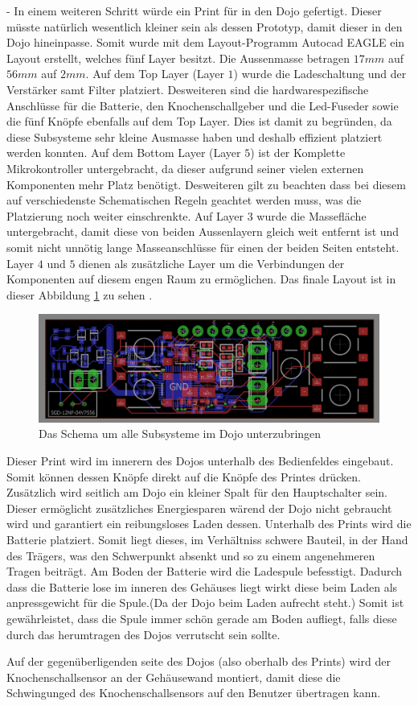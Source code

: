 - In einem weiteren Schritt würde ein Print für in den Dojo gefertigt. Dieser müsste natürlich wesentlich kleiner sein als dessen Prototyp, damit dieser in den Dojo hineinpasse. Somit wurde mit dem Layout-Programm Autocad EAGLE ein Layout erstellt, welches fünf Layer besitzt. Die Aussenmasse betragen $17mm$ auf $56mm$ auf $2mm$. Auf dem Top Layer (Layer $1$) wurde die Ladeschaltung und der Verstärker samt Filter platziert. Desweiteren sind die  hardwarespezifische Anschlüsse für die Batterie, den Knochenschallgeber und die Led-Fuseder sowie die fünf Knöpfe ebenfalls auf dem Top Layer. Dies ist damit zu begründen, da diese Subsysteme sehr kleine Ausmasse haben und deshalb effizient platziert werden konnten. Auf dem Bottom Layer (Layer $5$) ist der Komplette Mikrokontroller untergebracht, da dieser aufgrund seiner vielen externen Komponenten mehr Platz benötigt. Desweiteren gilt zu beachten dass bei diesem auf verschiedenste Schematischen Regeln geachtet werden muss, was die Platzierung noch weiter einschrenkte. Auf Layer $3$ wurde die Massefläche untergebracht, damit diese von beiden Aussenlayern gleich weit entfernt ist und somit nicht unnötig lange Masseanschlüsse für einen der beiden Seiten entsteht. Layer $4$ und $5$ dienen als zusätzliche Layer um die Verbindungen der Komponenten auf diesem engen Raum zu ermöglichen. Das finale Layout ist in dieser Abbildung \ref{fig:dojo_layout} zu sehen .
\begin{figure}[H]
	\begin{center}
		\includegraphics[width=160mm]{data/dojo_layout.png}
		\caption[Das Schema um alle Subsysteme im Dojo unterzubringen]{Das Schema um alle Subsysteme im Dojo unterzubringen} %
		\label{fig:dojo_layout}
	\end{center}
\end{figure}

Dieser Print wird im innerern des Dojos unterhalb des Bedienfeldes eingebaut. Somit können dessen Knöpfe direkt auf die Knöpfe des Printes drücken. Zusätzlich wird seitlich am Dojo ein kleiner Spalt für den Hauptschalter sein. Dieser ermöglicht zusätzliches Energiesparen wärend der Dojo nicht gebraucht wird und garantiert ein reibungsloses Laden dessen. Unterhalb des Prints wird die Batterie platziert. Somit liegt dieses, im Verhältniss schwere Bauteil, in der Hand des Trägers, was den Schwerpunkt absenkt und so zu einem angenehmeren Tragen beiträgt. Am Boden der Batterie wird die Ladespule befesstigt. Dadurch dass die Batterie lose im inneren des Gehäuses liegt wirkt diese beim Laden als anpressgewicht für die Spule.(Da der Dojo beim Laden aufrecht steht.) Somit ist gewährleistet, dass die Spule immer schön gerade am Boden aufliegt, falls diese durch das herumtragen des Dojos verrutscht sein sollte. 

Auf der gegenüberligenden seite des Dojos (also oberhalb des Prints) wird der Knochenschallsensor an der Gehäusewand montiert, damit diese die Schwingunged des Knochenschallsensors auf den Benutzer übertragen kann.